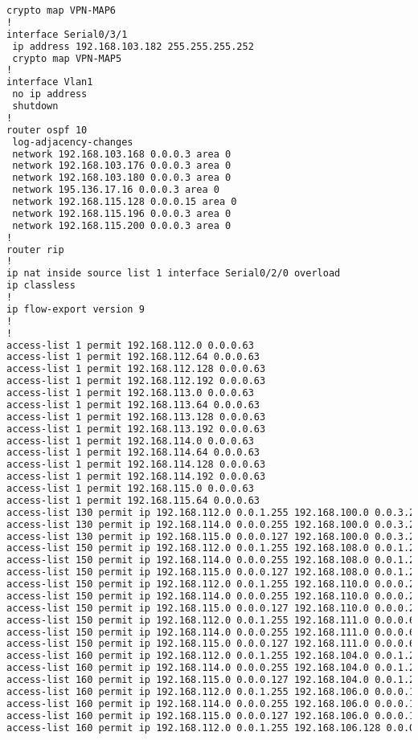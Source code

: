 \begin{lstlisting}[language=Bash, caption={Configuración Completa Router Son Llàtzer}]
 crypto map VPN-MAP6
!
interface Serial0/3/1
 ip address 192.168.103.182 255.255.255.252
 crypto map VPN-MAP5
!
interface Vlan1
 no ip address
 shutdown
!
router ospf 10
 log-adjacency-changes
 network 192.168.103.168 0.0.0.3 area 0
 network 192.168.103.176 0.0.0.3 area 0
 network 192.168.103.180 0.0.0.3 area 0
 network 195.136.17.16 0.0.0.3 area 0
 network 192.168.115.128 0.0.0.15 area 0
 network 192.168.115.196 0.0.0.3 area 0
 network 192.168.115.200 0.0.0.3 area 0
!
router rip
!
ip nat inside source list 1 interface Serial0/2/0 overload
ip classless
!
ip flow-export version 9
!
!
access-list 1 permit 192.168.112.0 0.0.0.63
access-list 1 permit 192.168.112.64 0.0.0.63
access-list 1 permit 192.168.112.128 0.0.0.63
access-list 1 permit 192.168.112.192 0.0.0.63
access-list 1 permit 192.168.113.0 0.0.0.63
access-list 1 permit 192.168.113.64 0.0.0.63
access-list 1 permit 192.168.113.128 0.0.0.63
access-list 1 permit 192.168.113.192 0.0.0.63
access-list 1 permit 192.168.114.0 0.0.0.63
access-list 1 permit 192.168.114.64 0.0.0.63
access-list 1 permit 192.168.114.128 0.0.0.63
access-list 1 permit 192.168.114.192 0.0.0.63
access-list 1 permit 192.168.115.0 0.0.0.63
access-list 1 permit 192.168.115.64 0.0.0.63
access-list 130 permit ip 192.168.112.0 0.0.1.255 192.168.100.0 0.0.3.255
access-list 130 permit ip 192.168.114.0 0.0.0.255 192.168.100.0 0.0.3.255
access-list 130 permit ip 192.168.115.0 0.0.0.127 192.168.100.0 0.0.3.255
access-list 150 permit ip 192.168.112.0 0.0.1.255 192.168.108.0 0.0.1.255
access-list 150 permit ip 192.168.114.0 0.0.0.255 192.168.108.0 0.0.1.255
access-list 150 permit ip 192.168.115.0 0.0.0.127 192.168.108.0 0.0.1.255
access-list 150 permit ip 192.168.112.0 0.0.1.255 192.168.110.0 0.0.0.255
access-list 150 permit ip 192.168.114.0 0.0.0.255 192.168.110.0 0.0.0.255
access-list 150 permit ip 192.168.115.0 0.0.0.127 192.168.110.0 0.0.0.255
access-list 150 permit ip 192.168.112.0 0.0.1.255 192.168.111.0 0.0.0.63
access-list 150 permit ip 192.168.114.0 0.0.0.255 192.168.111.0 0.0.0.63
access-list 150 permit ip 192.168.115.0 0.0.0.127 192.168.111.0 0.0.0.63
access-list 160 permit ip 192.168.112.0 0.0.1.255 192.168.104.0 0.0.1.255
access-list 160 permit ip 192.168.114.0 0.0.0.255 192.168.104.0 0.0.1.255
access-list 160 permit ip 192.168.115.0 0.0.0.127 192.168.104.0 0.0.1.255
access-list 160 permit ip 192.168.112.0 0.0.1.255 192.168.106.0 0.0.0.127
access-list 160 permit ip 192.168.114.0 0.0.0.255 192.168.106.0 0.0.0.127
access-list 160 permit ip 192.168.115.0 0.0.0.127 192.168.106.0 0.0.0.127
access-list 160 permit ip 192.168.112.0 0.0.1.255 192.168.106.128 0.0.0.63

\end{lstlisting}
